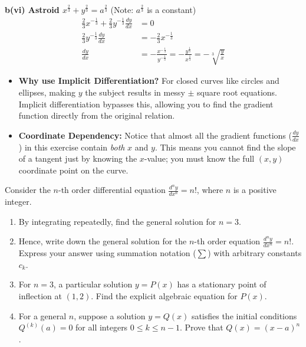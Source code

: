 \begin{solution}
\textbf{b(vi) Astroid $x^{\frac{2}{3}} + y^{\frac{2}{3}} = a^{\frac{2}{3}}$} (Note: $a^{\frac{2}{3}}$ is a constant)
\begin{align*}
    \frac{2}{3}x^{-\frac{1}{3}} + \frac{2}{3}y^{-\frac{1}{3}} \frac{dy}{dx} &= 0 \\
    \frac{2}{3}y^{-\frac{1}{3}} \frac{dy}{dx} &= -\frac{2}{3}x^{-\frac{1}{3}} \\
    \frac{dy}{dx} &= -\frac{x^{-\frac{1}{3}}}{y^{-\frac{1}{3}}} = -\frac{y^{\frac{1}{3}}}{x^{\frac{1}{3}}} = -\sqrt[3]{\frac{y}{x}}
\end{align*}
\end{solution}

\begin{takeaways}
\begin{itemize}[leftmargin=*]
    \item \textbf{Why use Implicit Differentiation?} For closed curves like circles and ellipses, making $y$ the subject results in messy $\pm$ square root equations. Implicit differentiation bypasses this, allowing you to find the gradient function directly from the original relation.
    \item \textbf{Coordinate Dependency:} Notice that almost all the gradient functions ($\frac{dy}{dx}$) in this exercise contain \textit{both} $x$ and $y$. This means you cannot find the slope of a tangent just by knowing the $x$-value; you must know the full $(x, y)$ coordinate point on the curve.
\end{itemize}
\end{takeaways}

\begin{problem}
Consider the $n$-th order differential equation $\frac{d^n y}{dx^n} = n!$, where $n$ is a positive integer.

\begin{enumerate}
    \item[\textbf{i}] By integrating repeatedly, find the general solution for $n=3$.
    \item[\textbf{ii}] Hence, write down the general solution for the $n$-th order equation $\frac{d^n y}{dx^n} = n!$. Express your answer using summation notation ($\sum$) with arbitrary constants $c_k$.
    \item[\textbf{iii}] For $n=3$, a particular solution $y = P(x)$ has a stationary point of inflection at $(1, 2)$. Find the explicit algebraic equation for $P(x)$.
    \item[\textbf{iv}] For a general $n$, suppose a solution $y = Q(x)$ satisfies the initial conditions $Q^{(k)}(a) = 0$ for all integers $0 \le k \le n-1$. Prove that $Q(x) = (x-a)^n$.
\end{enumerate}
\end{problem}

